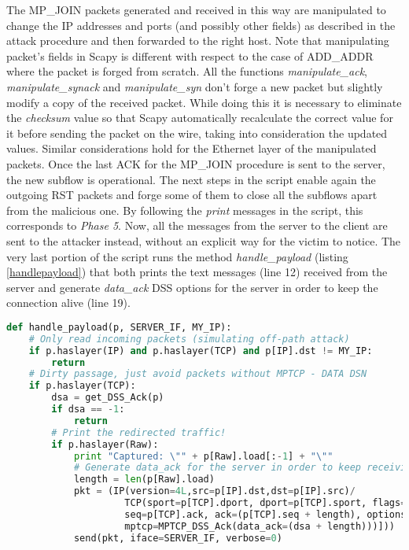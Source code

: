 The MP\_JOIN packets generated and received in this way are manipulated to change the IP addresses and ports (and possibly other fields) as described in the attack procedure and then forwarded to the right host. Note that manipulating packet's fields in Scapy is different with respect to the case of ADD\_ADDR where the packet is forged from scratch. All the functions \textit{manipulate\_ack}, \textit{manipulate\_synack} and \textit{manipulate\_syn} don't forge a new packet but slightly modify a copy of the received packet. While doing this it is necessary to eliminate the \textit{checksum} value so that Scapy automatically recalculate the correct value for it before sending the packet on the wire, taking into consideration the updated values. Similar considerations hold for the Ethernet layer of the manipulated packets. 
Once the last ACK for the MP\_JOIN procedure is sent to the server, the new subflow is operational. The next steps in the script enable again the outgoing RST packets and forge some of them to close all the subflows apart from the malicious one. By following the \textit{print} messages in the script, this corresponds to \textit{Phase 5}. Now, all the messages from the server to the client are sent to the attacker instead, without an explicit way for the victim to notice. 
The very last portion of the script runs the method \textit{handle\_payload} (listing \ref{handlepayload}) that both prints the text messages (line 12) received from the server and generate \textit{data\_ack} DSS options for the server in order to keep the connection alive (line 19). 

\begin{lstlisting}[language=python, caption=\textit{Filter function for the sniffing tool when receiving redirected traffic of the hijacked connection from the server}, label=handlepayload]
def handle_payload(p, SERVER_IF, MY_IP):
    # Only read incoming packets (simulating off-path attack)
    if p.haslayer(IP) and p.haslayer(TCP) and p[IP].dst != MY_IP:
        return
    # Dirty passage, just avoid packets without MPTCP - DATA DSN
    if p.haslayer(TCP):
        dsa = get_DSS_Ack(p)
        if dsa == -1:
            return
        # Print the redirected traffic!
        if p.haslayer(Raw):
            print "Captured: \"" + p[Raw].load[:-1] + "\""
            # Generate data_ack for the server in order to keep receiving the next messages
            length = len(p[Raw].load)
            pkt = (IP(version=4L,src=p[IP].dst,dst=p[IP].src)/                          \
                     TCP(sport=p[TCP].dport, dport=p[TCP].sport, flags="A",             \
                     seq=p[TCP].ack, ack=(p[TCP].seq + length), options=[TCPOption_MP(  \
                     mptcp=MPTCP_DSS_Ack(data_ack=(dsa + length)))]))
            send(pkt, iface=SERVER_IF, verbose=0)
\end{lstlisting}

